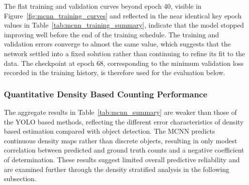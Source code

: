 The flat training and validation curves beyond epoch 40, visible in Figure~\ref{fig:mcnn_training_curves} and reflected in the near identical key epoch values in Table~\ref{tab:mcnn_training_summary}, indicate that the model stopped improving well before the end of the training schedule. The training and validation errors converge to almost the same value, which suggests that the network settled into a fixed solution rather than continuing to refine its fit to the data. The checkpoint at epoch 68, corresponding to the minimum validation loss recorded in the training history, is therefore used for the evaluation below.

\subsubsection{Quantitative Density Based Counting Performance}

The aggregate results in Table~\ref{tab:mcnn_summary} are weaker than those of the YOLO based methods, reflecting the different error characteristics of density based estimation compared with object detection. The MCNN predicts continuous density maps rather than discrete objects, resulting in only modest correlation between predicted and ground truth counts and a negative coefficient of determination. These results suggest limited overall predictive reliability and are examined further through the density stratified analysis in the following subsection.

